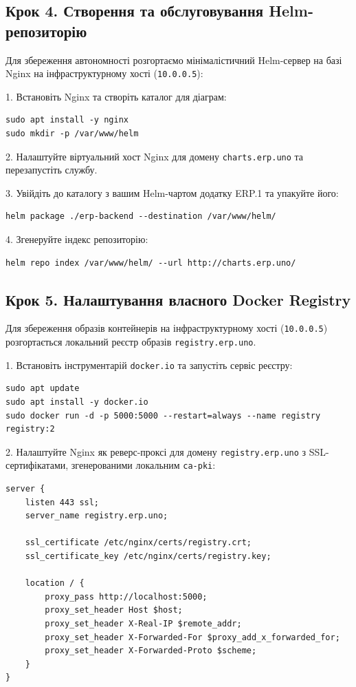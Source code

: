 \subsection{Крок 4. Створення та обслуговування Helm-репозиторію}
Для збереження автономності розгортаємо мінімалістичний Helm-сервер на базі Nginx на інфраструктурному хості (\texttt{10.0.0.5}):

1. Встановіть Nginx та створіть каталог для діаграм:
\begin{lstlisting}
sudo apt install -y nginx
sudo mkdir -p /var/www/helm
\end{lstlisting}

2. Налаштуйте віртуальний хост Nginx для домену \texttt{charts.erp.uno} та перезапустіть службу.

3. Увійдіть до каталогу з вашим Helm-чартом додатку ERP.1 та упакуйте його:
\begin{lstlisting}
helm package ./erp-backend --destination /var/www/helm/
\end{lstlisting}

4. Згенеруйте індекс репозиторію:
\begin{lstlisting}
helm repo index /var/www/helm/ --url http://charts.erp.uno/
\end{lstlisting}

\subsection{Крок 5. Налаштування власного Docker Registry}
Для збереження образів контейнерів на інфраструктурному хості (\texttt{10.0.0.5}) розгортається локальний реєстр образів \texttt{registry.erp.uno}.

1. Встановіть інструментарій \texttt{docker.io} та запустіть сервіс реєстру:
\begin{lstlisting}
sudo apt update
sudo apt install -y docker.io
sudo docker run -d -p 5000:5000 --restart=always --name registry registry:2
\end{lstlisting}

2. Налаштуйте Nginx як реверс-проксі для домену \texttt{registry.erp.uno} з SSL-сертифікатами, згенерованими локальним \texttt{ca-pki}:
\begin{lstlisting}[mathescape=false]
server {
    listen 443 ssl;
    server_name registry.erp.uno;

    ssl_certificate /etc/nginx/certs/registry.crt;
    ssl_certificate_key /etc/nginx/certs/registry.key;

    location / {
        proxy_pass http://localhost:5000;
        proxy_set_header Host $host;
        proxy_set_header X-Real-IP $remote_addr;
        proxy_set_header X-Forwarded-For $proxy_add_x_forwarded_for;
        proxy_set_header X-Forwarded-Proto $scheme;
    }
}
\end{lstlisting}

